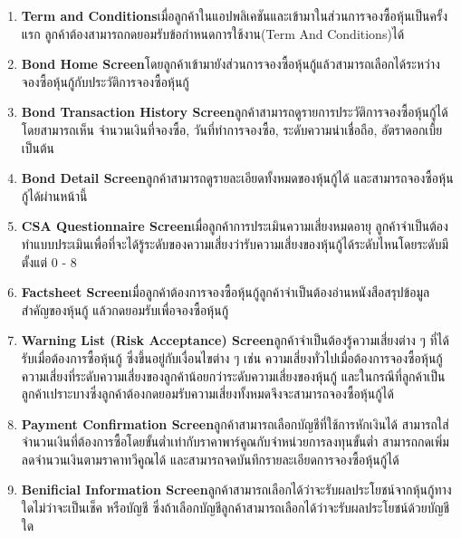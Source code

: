 \begin{enumerate}
    \item \textbf{Term and Conditions}\newline เมื่อลูกค้าในแอปพลิเคชันและเข้ามาในส่วนการจองซื้อหุ้นเป็นครั้งแรก ลูกค้าต้องสามารถกดยอมรับข้อกำหนดการใช้งาน(Term And Conditions)ได้
    \item \textbf{Bond Home Screen}\newline โดยลูกค้าเข้ามายังส่วนการจองซื้อหุ้นกู้แล้วสามารถเลือกได้ระหว่างจองซื้อหุ้นกู้กับประวัติการจองซื้อหุ้นกู้
    \item \textbf{Bond Transaction History Screen}\newline ลูกค้าสามารถดูรายการประวัติการจองซื้อหุ้นกู้ได้โดยสามารถเห็น จำนวนเงินที่จองซื้อ, วันที่ทำการจองซื้อ, ระดับความน่าเชื่อถือ, อัตราดอกเบื้ย เป็นต้น
    \item \textbf{Bond Detail Screen}\newline ลูกค้าสามารถดูรายละเอียดทั้งหมดของหุ้นกู้ได้ และสามารถจองซื้อหุ้นกู้ได้ผ่านหน้านี้
    \item \textbf{CSA Questionnaire Screen}\newline เมื่อลูกค้าการประเมินความเสี่ยงหมดอายุ ลูกค้าจำเป็นต้องทำแบบประเมินเพื่อที่จะได้รู้ระดับของความเสี่ยงว่ารับความเสี่ยงของหุ้นกู้ได้ระดับไหนโดยระดับมีตั้งแต่ 0 - 8
    \item \textbf{Factsheet Screen}\newline เมื่อลูกค้าต้องการจองซื้อหุ้นกู้ลูกค้าจำเป็นต้องอ่านหนังสือสรุปข้อมูลสำคัญของหุ้นกู้ แล้วกดยอมรับเพื่อจองซื้อหุ้นกู้
    \item \textbf{Warning List (Risk Acceptance) Screen}\newline ลูกค้าจำเป็นต้องรู้ความเสี่ยงต่าง ๆ ที่ได้รับเมื่อต้องการซื้อหุ้นกู้ ซึ่งขึ้นอยู่กับเงื่อนไขต่าง ๆ เช่น ความเสี่ยงทั่วไปเมื่อต้องการจองซื้อหุ้นกู้ ความเสี่ยงที่ระดับความเสี่ยงของลูกค้าน้อยกว่าระดับความเสี่ยงของหุ้นกู้ และในกรณีที่ลูกค้าเป็นลูกค้าเปราะบางซึ่งลูกค้าต้องกดยอมรับความเสี่ยงทั้งหมดจึงจะสามารถจองซื้อหุ้นกู้ได้
    \item \textbf{Payment Confirmation Screen}\newline ลูกค้าสามารถเลือกบัญชีที่ใช้การหักเงินได้ สามารถใส่จำนวนเงินที่ต้องการซื้อโดยขั้นต่ำเท่ากับราคาพาร์คูณกับจำหน่วยการลงทุนขั้นต่ำ สามารถกดเพิ่มลดจำนวนเงินตามราคาทวีคูณได้ และสามารถจดบันทึกรายละเอียดการจองซื้อหุ้นกู้ได้
    \item \textbf{Benificial Information Screen}\newline ลูกค้าสามารถเลือกได้ว่าจะรับผลประโยชน์จากหุ้นกู้ทางใดไม่ว่าจะเป็นเช็ค หรือบัญชี ซึ่งถ้าเลือกบัญชีลูกค้าสามารถเลือกได้ว่าจะรับผลประโยชน์ด้วยบัญชีใด

\end{enumerate}
